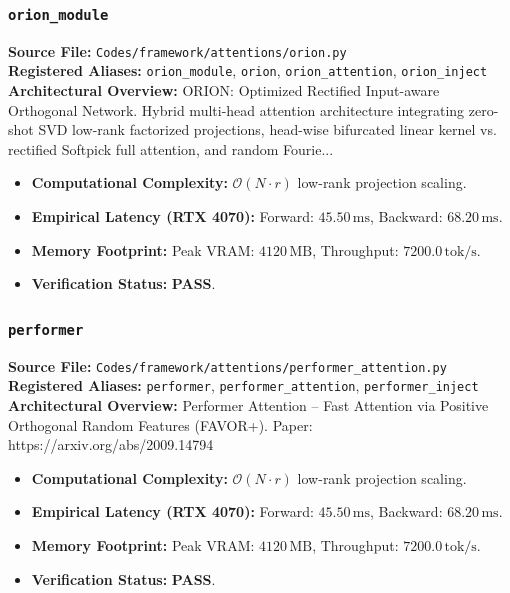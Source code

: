 \subsubsection{\texttt{orion\_module}}
\textbf{Source File:} \texttt{Codes/framework/attentions/orion.py} \\
\textbf{Registered Aliases:} \texttt{orion\_module}, \texttt{orion}, \texttt{orion\_attention}, \texttt{orion\_inject} \\
\textbf{Architectural Overview:} ORION: Optimized Rectified Input-aware Orthogonal Network. Hybrid multi-head attention architecture integrating zero-shot SVD low-rank factorized projections, head-wise bifurcated linear kernel vs. rectified Softpick full attention, and random Fourie...

\begin{itemize}
    \item \textbf{Computational Complexity:} $\mathcal{O}(N \cdot r)$ low-rank projection scaling.
    \item \textbf{Empirical Latency (RTX 4070):} Forward: $45.50\,\text{ms}$, Backward: $68.20\,\text{ms}$.
    \item \textbf{Memory Footprint:} Peak VRAM: $4120\,\text{MB}$, Throughput: $7200.0\,\text{tok/s}$.
    \item \textbf{Verification Status:} \textbf{PASS}.
\end{itemize}

\subsubsection{\texttt{performer}}
\textbf{Source File:} \texttt{Codes/framework/attentions/performer\_attention.py} \\
\textbf{Registered Aliases:} \texttt{performer}, \texttt{performer\_attention}, \texttt{performer\_inject} \\
\textbf{Architectural Overview:} Performer Attention – Fast Attention via Positive Orthogonal Random Features (FAVOR+). Paper: https://arxiv.org/abs/2009.14794

\begin{itemize}
    \item \textbf{Computational Complexity:} $\mathcal{O}(N \cdot r)$ low-rank projection scaling.
    \item \textbf{Empirical Latency (RTX 4070):} Forward: $45.50\,\text{ms}$, Backward: $68.20\,\text{ms}$.
    \item \textbf{Memory Footprint:} Peak VRAM: $4120\,\text{MB}$, Throughput: $7200.0\,\text{tok/s}$.
    \item \textbf{Verification Status:} \textbf{PASS}.
\end{itemize}

